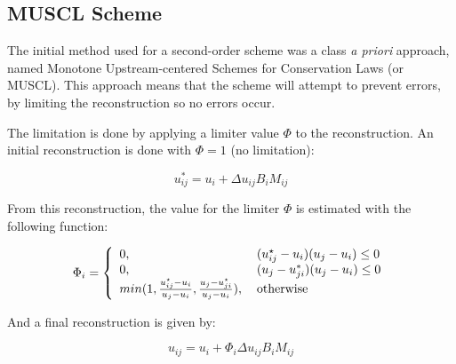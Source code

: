 \subsection{MUSCL Scheme}
\label{sec:410}

The initial method used for a second-order scheme was a class \textit{a priori} approach, named Monotone Upstream-centered Schemes for Conservation Laws (or MUSCL). This approach means that the scheme will attempt to prevent errors, by limiting the reconstruction so no errors occur.

The limitation is done by applying a limiter value $\Phi$ to the reconstruction. An initial reconstruction is done with $\Phi = 1$ (no limitation):

$$
u_{ij}^{*} = u_i + \Delta u_{ij} B_i M_{ij}
$$

From this reconstruction, the value for the limiter $\Phi$ is estimated with the following function:

$$
\Phi_i = \left\{
	\begin{array}{l l}
		0, & \: (u_{ij}^{\star} - u_i) (u_j - u_i) \le 0\\
		0, & \: (u_j - u_{ji}^*) (u_j - u_i) \le 0\\
		min(1, \frac{u_{ij}^{\star} - u_i}{u_j - u_i}, \frac{u_j - u_{ji}^{\star}}{u_j - u_i}), & \: \text{otherwise}
	\end{array}\right.
$$

And a final reconstruction is given by:

$$
u_{ij} = u_i + \Phi_i \Delta u_{ij} B_i M_{ij}
$$